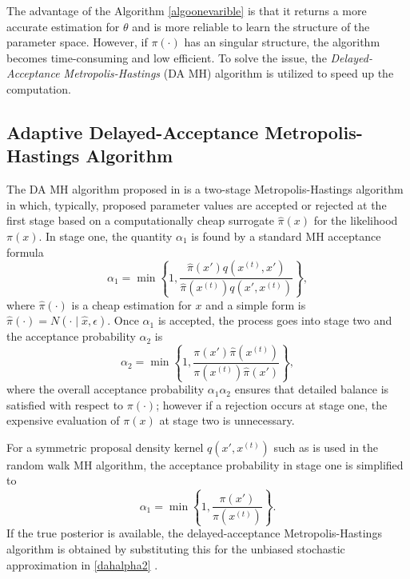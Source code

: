 The advantage of the Algorithm \ref{algoonevarible} is that it returns a more accurate estimation for $\theta$ and is more reliable to learn the structure of the parameter space. However, if $\pi(\cdot)$ has an singular structure, the algorithm becomes time-consuming and low efficient. To solve the issue, the \textit{Delayed-Acceptance Metropolis-Hastings} (DA MH) algorithm is utilized to speed up the computation.





\subsection{Adaptive Delayed-Acceptance Metropolis-Hastings Algorithm}

The DA MH algorithm proposed in \citep{christen2005markov} is a two-stage Metropolis-Hastings algorithm in which, typically, proposed parameter values are accepted or rejected at the first stage based on a computationally cheap surrogate $\hat{\pi}(x)$ for the likelihood $\pi(x)$. In stage one, the quantity $\alpha_1$ is found by a standard MH acceptance formula 
\begin{equation}
\alpha_1=\min\left\lbrace  1,\frac{\hat{\pi}(x')q\left(x^{(t)}, x'\right)}{\hat{\pi}(x^{(t)})q\left(x', x^{(t)}\right)}  \right\rbrace ,
\end{equation}
where $\hat{\pi}(\cdot)$ is a cheap estimation for $x$ and a simple form is $\hat{\pi}(\cdot)=N\left(\cdot\mid \hat{x},\epsilon\right)$. Once $\alpha_1$ is accepted, the process goes into stage two and the acceptance probability $\alpha_2$ is
\begin{equation}\label{dahalpha2}
\alpha_2=\min \left\lbrace  1,\frac{\pi(x')\hat{\pi}\left(x^{(t)}\right) }{\pi\left(x^{(t)}\right)\hat{\pi}(x')} \right\rbrace,
\end{equation}
where the overall acceptance probability $\alpha_1\alpha_2$ ensures that detailed balance is satisfied with respect to $\pi(\cdot)$; however if a rejection occurs at stage one, the expensive evaluation of $\pi(x)$ at stage two is unnecessary.

For a symmetric proposal density kernel $q\left(x', x^{(t)}\right)$ such as is used in the random walk MH algorithm, the acceptance probability in stage one is simplified to
\begin{equation} \label{dahalpha1}
\alpha_1= \min \left\lbrace 1,\frac{\pi(x')}{\pi\left(x^{(t)}\right)}  \right\rbrace.
\end{equation}
If the true posterior is available, the delayed-acceptance Metropolis-Hastings algorithm is obtained by substituting this for the unbiased stochastic approximation in \eqref{dahalpha2} \citep{sherlock2015efficiency}.


